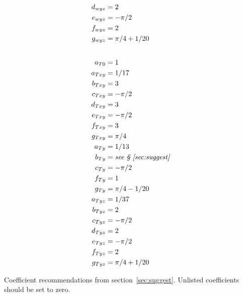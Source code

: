 \documentclass[10pt,reqno]{amsart}
\begin{document}
\begin{table}[p]
\begin{multicols}{3}
\begin{small}
\begin{align*}
d_{wyz} &= 2 \\
e_{wyz} &= - \pi / 2 \\
f_{wyz} &= 2 \\
g_{wyz} &= \pi / 4 + 1 / 20 \\
\intertext{}
a_{T0} &= 1 \\
a_{Txy} &= 1 / 17 \\
b_{Txy} &= 3 \\
c_{Txy} &= - \pi / 2 \\
d_{Txy} &= 3 \\
e_{Txy} &= - \pi / 2 \\
f_{Txy} &= 3 \\
g_{Txy} &= \pi / 4 \\
a_{Ty} &= 1 / 13 \\
b_{Ty} &= \text{\emph{see \textsection{}~\ref{sec:suggest}}} \\
c_{Ty} &= - \pi / 2 \\
f_{Ty} &= 1 \\
g_{Ty} &= \pi / 4 - 1 / 20 \\
a_{Tyz} &= 1 / 37 \\
b_{Tyz} &= 2 \\
c_{Tyz} &= - \pi / 2 \\
d_{Tyz} &= 2 \\
e_{Tyz} &= - \pi / 2 \\
f_{Tyz} &= 2 \\
g_{Tyz} &= \pi / 4 + 1 / 20 \\
\end{align*}
\end{small}
\end{multicols}
\caption{Coefficient recommendations from section~\ref{sec:suggest}.
         Unlisted coefficients should be set to zero.
         \label{tbl:auxcoeff}}
\end{table}
\end{document}
